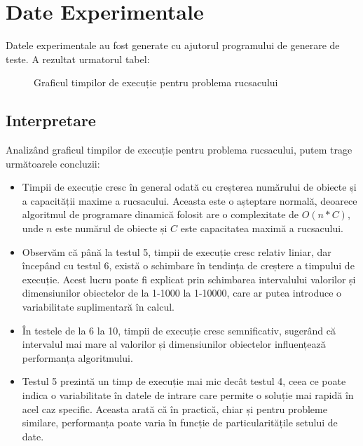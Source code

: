 \documentclass[a4paper,12pt]{article}
\begin{document}
\section{Date Experimentale}
Datele experimentale au fost generate cu ajutorul programului de generare de teste. A rezultat urmatorul tabel:

\begin{figure}[h!]
\centering
{}
\caption{Graficul timpilor de execuție pentru problema rucsacului}
\end{figure}

\subsection{Interpretare}

Analizând graficul timpilor de execuție pentru problema rucsacului, putem trage următoarele concluzii:

\begin{itemize}
    \item Timpii de execuție cresc în general odată cu creșterea numărului de obiecte și a capacității maxime a rucsacului. Aceasta este o așteptare normală, deoarece algoritmul de programare dinamică folosit are o complexitate de \(O(n * C)\), unde \(n\) este numărul de obiecte și \(C\) este capacitatea maximă a rucsacului.
    \item Observăm că până la testul 5, timpii de execuție cresc relativ liniar, dar începând cu testul 6, există o schimbare în tendința de creștere a timpului de execuție. Acest lucru poate fi explicat prin schimbarea intervalului valorilor și dimensiunilor obiectelor de la 1-1000 la 1-10000, care ar putea introduce o variabilitate suplimentară în calcul.
    \item În testele de la 6 la 10, timpii de execuție cresc semnificativ, sugerând că intervalul mai mare al valorilor și dimensiunilor obiectelor influențează performanța algoritmului.
    \item Testul 5 prezintă un timp de execuție mai mic decât testul 4, ceea ce poate indica o variabilitate în datele de intrare care permite o soluție mai rapidă în acel caz specific. Aceasta arată că în practică, chiar și pentru probleme similare, performanța poate varia în funcție de particularitățile setului de date.
\end{itemize}
\end{document}
